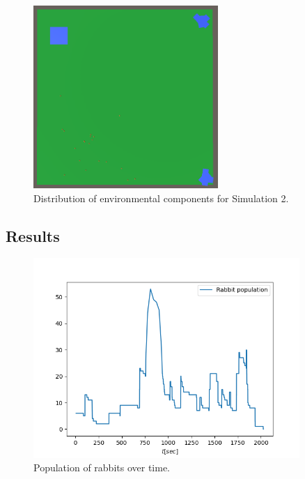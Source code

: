 \begin{figure}[H]
    \centering
    \includegraphics[width=7cm]{Images/Area_Simulation_4_small_amount_of_food.png}
    \caption{Distribution of environmental components for Simulation 2.}
    \label{fig:simulation2EnvLayout}
\end{figure}
    
\subsection{Results}

\begin{figure}[H]
    \centering
    \includegraphics[width=0.9\textwidth]{Images/SimulationResults/Simulation_4_Rabbit population.png}
    \caption{Population of rabbits over time.}
    \label{fig:simulation2RabbitPopulation}
\end{figure}

